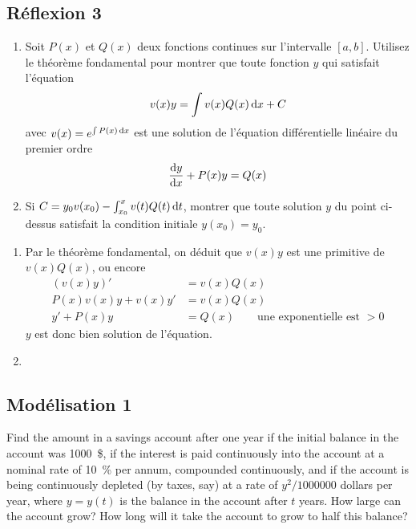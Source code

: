 \subsection{Réflexion 3}
\begin{enumerate}
    \item Soit $P(x)$ et $Q(x)$ deux fonctions continues sur l'intervalle $[a, b]$. Utilisez le théorème fondamental pour montrer que toute fonction $y$ qui satisfait l'équation
        \[ v(x) y = \int v(x) Q(x) \operatorname{d}\! x + C \]
        avec $v(x) = e^{\int P(x) \operatorname{d}\! x}$ est une solution de l'équation différentielle linéaire du premier ordre
        \[ \frac{\operatorname{d}\! y}{\operatorname{d}\! x} + P(x) y = Q(x) \]
    \item Si $C = y_0v(x_0) - \int_{x_0}^x v(t) Q(t) \operatorname{d}\! t$, montrer que toute solution $y$ du point ci-dessus satisfait la condition initiale $y(x_0) = y_0$.
\end{enumerate}

\begin{solution}
    \begin{enumerate}
        \item Par le théorème fondamental, on déduit que $v(x) y$ est une primitive de $v(x) Q(x)$, ou encore
            \begin{align*}
            \left( v(x) y \right) ' &= v(x) Q(x) \\
            P(x) v(x) y + v(x) y' &= v(x) Q(x) \\
            y' + P(x) y &= Q(x) \qquad \text{une exponentielle est $>0$}
            \end{align*}
            $y$ est donc bien solution de l'équation.
        \item 
    \end{enumerate}
\end{solution}

\subsection{Modélisation 1}
Find the amount in a savings account after one year if the initial balance in the account was \SI{1000}{\$}, if the interest is paid continuously into the account at a nominal rate of \SI{10}{\percent} per annum, compounded continuously, and if the account is being continuously depleted (by taxes, say) at a rate of $y^2/\num{1000000}$ dollars per year, where $y=y(t)$ is the balance in the account after $t$ years. How large can the account grow? How long will it take the account to grow to half this balance?

